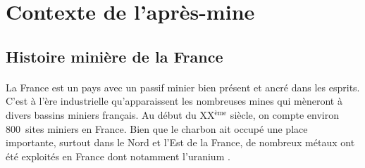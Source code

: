 \documentclass{article}
\begin{document}

\newpage
{}

\section{Contexte de l’après-mine}

\subsection{Histoire minière de la France}

\paragraph{} La France est un pays avec un passif minier bien présent et ancré dans les esprits. C’est à l’ère industrielle qu’apparaissent les nombreuses mines qui mèneront à divers bassins miniers français. Au début du XX$^\text{ème}$ siècle, on compte environ 800~sites miniers en France. Bien que le charbon ait occupé une place importante, surtout dans le Nord et l'Est de la France, de nombreux métaux ont été exploités en France dont notamment l’uranium \cite{ledoux_notions_2020}.


\end{document}
